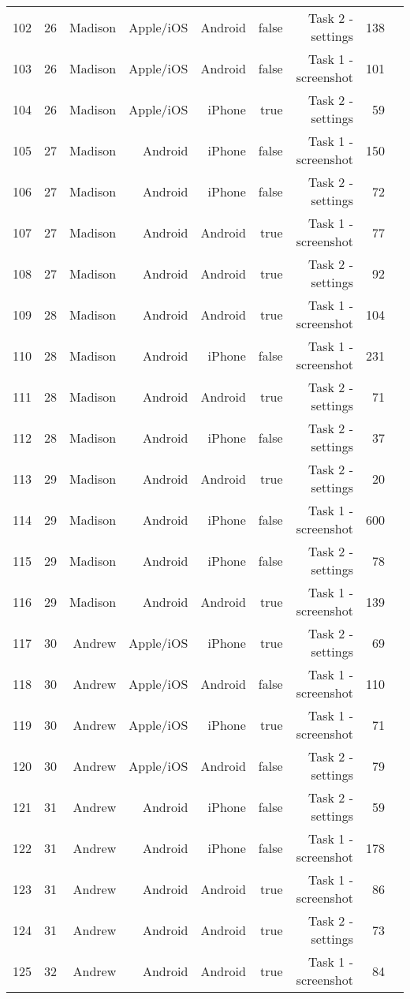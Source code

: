 \documentclass[conference]{IEEEtran}
\begin{document}
\begin{table}[!htp]
\begin{tabular}{lrrrrrrrr}
102 &26 &Madison &Apple/iOS &Android &false &Task 2 - settings &138 \\
103 &26 &Madison &Apple/iOS &Android &false &Task 1 - screenshot &101 \\
104 &26 &Madison &Apple/iOS &iPhone &true &Task 2 - settings &59 \\
105 &27 &Madison &Android &iPhone &false &Task 1 - screenshot &150 \\
106 &27 &Madison &Android &iPhone &false &Task 2 - settings &72 \\
107 &27 &Madison &Android &Android &true &Task 1 - screenshot &77 \\
108 &27 &Madison &Android &Android &true &Task 2 - settings &92 \\
109 &28 &Madison &Android &Android &true &Task 1 - screenshot &104 \\
110 &28 &Madison &Android &iPhone &false &Task 1 - screenshot &231 \\
111 &28 &Madison &Android &Android &true &Task 2 - settings &71 \\
112 &28 &Madison &Android &iPhone &false &Task 2 - settings &37 \\
113 &29 &Madison &Android &Android &true &Task 2 - settings &20 \\
114 &29 &Madison &Android &iPhone &false &Task 1 - screenshot &600 \\
115 &29 &Madison &Android &iPhone &false &Task 2 - settings &78 \\
116 &29 &Madison &Android &Android &true &Task 1 - screenshot &139 \\
117 &30 &Andrew &Apple/iOS &iPhone &true &Task 2 - settings &69 \\
118 &30 &Andrew &Apple/iOS &Android &false &Task 1 - screenshot &110 \\
119 &30 &Andrew &Apple/iOS &iPhone &true &Task 1 - screenshot &71 \\
120 &30 &Andrew &Apple/iOS &Android &false &Task 2 - settings &79 \\
121 &31 &Andrew &Android &iPhone &false &Task 2 - settings &59 \\
122 &31 &Andrew &Android &iPhone &false &Task 1 - screenshot &178 \\
123 &31 &Andrew &Android &Android &true &Task 1 - screenshot &86 \\
124 &31 &Andrew &Android &Android &true &Task 2 - settings &73 \\
125 &32 &Andrew &Android &Android &true &Task 1 - screenshot &84 \\

\end{tabular}
\end{table}
\end{document}
